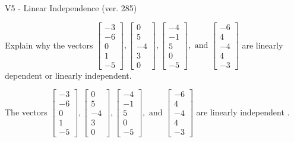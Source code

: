 \begin{exercise}
  \begin{exerciseTitle}V5 - Linear Independence (ver. 285)\end{exerciseTitle}
  \begin{exerciseStatement}
    Explain why the vectors \(\left[\begin{array}{r}
-3 \\
-6 \\
0 \\
1 \\
-5
\end{array}\right] , \left[\begin{array}{r}
0 \\
5 \\
-4 \\
3 \\
0
\end{array}\right] , \left[\begin{array}{r}
-4 \\
-1 \\
5 \\
0 \\
-5
\end{array}\right] , \text{ and } \left[\begin{array}{r}
-6 \\
4 \\
-4 \\
4 \\
-3
\end{array}\right]\) are linearly dependent or linearly independent.	


  \end{exerciseStatement}
  \begin{exerciseAnswer}
   The vectors \(\left[\begin{array}{r}
-3 \\
-6 \\
0 \\
1 \\
-5
\end{array}\right] , \left[\begin{array}{r}
0 \\
5 \\
-4 \\
3 \\
0
\end{array}\right] , \left[\begin{array}{r}
-4 \\
-1 \\
5 \\
0 \\
-5
\end{array}\right] , \text{ and } \left[\begin{array}{r}
-6 \\
4 \\
-4 \\
4 \\
-3
\end{array}\right]\) are 
  	 linearly independent  .
  


  \end{exerciseAnswer}
\end{exercise}